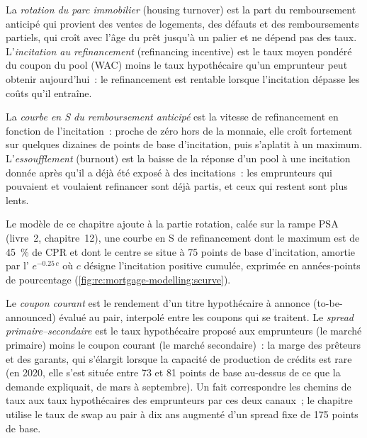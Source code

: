 \begin{definition}\label{def:rc:mortgage-modelling:turnover}
La \emph{rotation du parc immobilier} (housing turnover) est la part du remboursement anticipé qui provient
des ventes de logements, des défauts et des remboursements partiels, qui croît avec l'âge du prêt jusqu'à un palier et ne dépend pas des taux.
L'\emph{incitation au refinancement} (refinancing incentive) est le taux moyen pondéré du coupon du pool (WAC)
moins le taux hypothécaire qu'un emprunteur peut obtenir aujourd'hui~: le refinancement est rentable
lorsque l'incitation dépasse les coûts qu'il entraîne.
\end{definition}

\begin{definition}\label{def:rc:mortgage-modelling:scurve}
La \emph{courbe en S du remboursement anticipé} est la vitesse de refinancement
en fonction de l'incitation~: proche de zéro hors de la monnaie, elle croît fortement sur quelques dizaines de points de base
d'incitation, puis s'aplatit à un maximum. L'\emph{essoufflement} (burnout) est la baisse de la réponse d'un pool à une incitation donnée
après qu'il a déjà été exposé à des incitations~: les emprunteurs qui pouvaient et voulaient refinancer
sont déjà partis, et
ceux qui restent sont plus lents.
\end{definition}

Le modèle de ce chapitre ajoute à la partie rotation, calée sur la rampe PSA
(livre~2, chapitre~12), une courbe en S de refinancement dont le maximum est de 45~\% de CPR et dont le centre se situe
à 75 points de base d'incitation, amortie par l' $e^{-0.25\,c}$ où $c$ désigne l'incitation positive cumulée,
exprimée en années-points de pourcentage
(\cref{fig:rc:mortgage-modelling:scurve}).

\begin{definition}\label{def:rc:mortgage-modelling:cc}
Le \emph{coupon courant} est le rendement d'un titre hypothécaire à annonce (to-be-announced)
évalué au pair, interpolé entre les coupons qui se traitent. Le \emph{spread primaire--secondaire}
est le taux hypothécaire proposé aux emprunteurs (le marché primaire) moins le coupon courant (le marché secondaire)~:
la marge des prêteurs et des garants, qui s'élargit lorsque la capacité de production de crédits est rare
(en 2020, elle s'est située entre 73 et 81 points de base au-dessus de ce que la demande expliquait,
de mars à septembre). Un  fait correspondre les chemins de taux aux taux hypothécaires des emprunteurs
par ces deux canaux~; le chapitre utilise le taux de swap au pair à dix ans augmenté d'un spread fixe de 175
points de base.
\end{definition}

